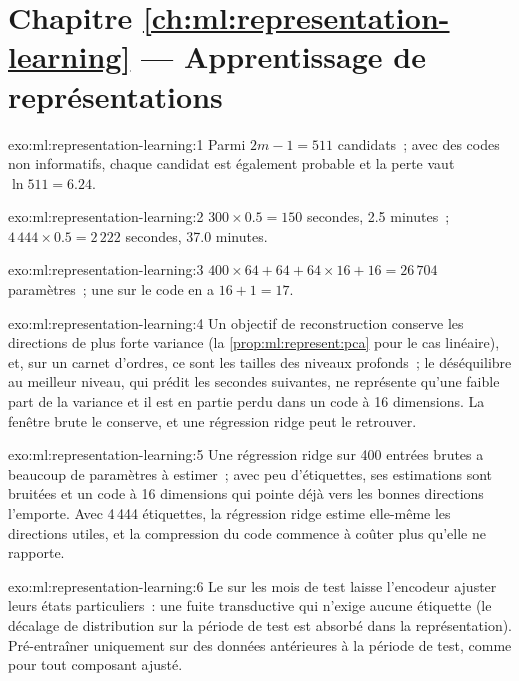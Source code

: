 \section*{Chapitre \ref{ch:ml:representation-learning} --- Apprentissage de représentations}

\begin{solution}{exo:ml:representation-learning:1}
Parmi $2m - 1 = 511$ candidats~; avec des codes non informatifs, chaque candidat est également probable et la perte vaut
$\ln 511 = 6.24$.
\end{solution}

\begin{solution}{exo:ml:representation-learning:2}
$300\times0.5 = 150$ secondes, 2.5 minutes~; $4\,444\times0.5 = 2\,222$ secondes, 37.0 minutes.
\end{solution}

\begin{solution}{exo:ml:representation-learning:3}
$400\times64 + 64 + 64\times16 + 16 = 26\,704$ paramètres~; une  sur le code en a $16 + 1 = 17$.
\end{solution}

\begin{solution}{exo:ml:representation-learning:4}
Un objectif de reconstruction conserve les directions de plus forte variance (la \cref{prop:ml:represent:pca} pour le cas linéaire),
et, sur un carnet d'ordres, ce sont les tailles des niveaux profonds~; le déséquilibre au meilleur niveau, qui prédit les secondes suivantes, ne représente qu'une faible
part de la variance et il est en partie perdu dans un code à 16 dimensions. La fenêtre brute le conserve, et une régression ridge peut le retrouver.
\end{solution}

\begin{solution}{exo:ml:representation-learning:5}
Une régression ridge sur 400 entrées brutes a beaucoup de paramètres à estimer~; avec peu d'étiquettes, ses estimations sont bruitées et un code à 16 dimensions
qui pointe déjà vers les bonnes directions l'emporte. Avec 4\,444 étiquettes, la régression ridge estime elle-même les directions utiles,
et la compression du code commence à coûter plus qu'elle ne rapporte.
\end{solution}

\begin{solution}{exo:ml:representation-learning:6}
Le  sur les mois de test laisse l'encodeur ajuster leurs états particuliers~: une fuite transductive qui
n'exige aucune étiquette (le décalage de distribution sur la période de test est absorbé dans la représentation). Pré-entraîner uniquement sur des données antérieures à la
période de test, comme pour tout composant ajusté.
\end{solution}

